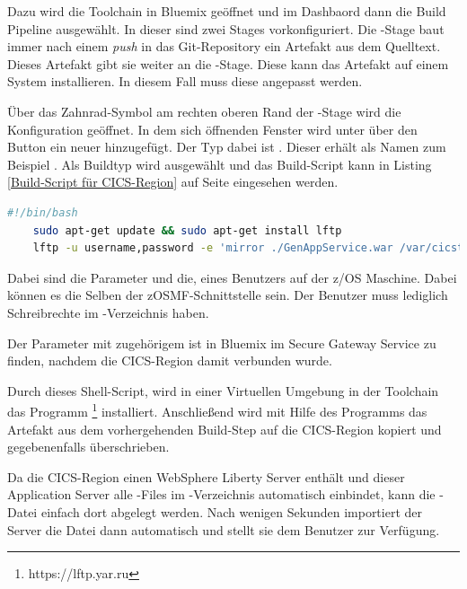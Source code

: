 Dazu wird die Toolchain in Bluemix geöffnet und im Dashbaord dann die Build Pipeline ausgewählt. In dieser sind zwei Stages
vorkonfiguriert. Die -Stage baut immer nach einem \textit{push} in das Git-Repository ein Artefakt aus dem
Quelltext. Dieses Artefakt gibt sie weiter an die -Stage. Diese kann das Artefakt auf einem System
installieren. In diesem Fall muss diese angepasst werden.

Über das Zahnrad-Symbol am rechten oberen Rand der -Stage wird die Konfiguration geöffnet. In dem sich
öffnenden Fenster wird unter  über den Button  ein neuer hinzugefügt. Der Typ dabei ist
. Dieser erhält als Namen zum Beispiel . Als Buildtyp wird  ausgewählt
und das Build-Script kann in Listing \ref{Build-Script für CICS-Region} auf Seite \pageref{Build-Script für CICS-Region}
eingesehen werden.

\begin{lstlisting}[language=bash, caption=Build-Script für CICS-Region, label=Build-Script für CICS-Region]
    #!/bin/bash
    sudo apt-get update && sudo apt-get install lftp
    lftp -u username,password -e 'mirror ./GenAppService.war /var/cicsts/CICSF000/workdir/DFHWLP/wlp/usr/servers/defaultServer/dropins/' secureGatewayURL:PORT
\end{lstlisting}

Dabei sind die Parameter  und  die, eines Benutzers auf der z/OS Maschine. Dabei können es
die Selben der zOSMF-Schnittstelle sein. Der Benutzer muss lediglich Schreibrechte im -Verzeichnis haben.

Der Parameter  mit zugehörigem  ist in Bluemix im Secure Gateway Service zu finden,
nachdem die CICS-Region damit verbunden wurde.

Durch dieses Shell-Script, wird in einer Virtuellen Umgebung in der Toolchain das Programm
\footnote{https://lftp.yar.ru} installiert. Anschließend wird mit Hilfe des Programms das Artefakt aus dem
vorhergehenden Build-Step auf die CICS-Region kopiert und gegebenenfalls überschrieben.

Da die CICS-Region einen WebSphere Liberty Server enthält und dieser Application Server alle -Files im
-Verzeichnis automatisch einbindet, kann die -Datei einfach dort abgelegt werden.
Nach wenigen Sekunden importiert der Server die Datei dann automatisch und stellt sie dem Benutzer zur Verfügung.

